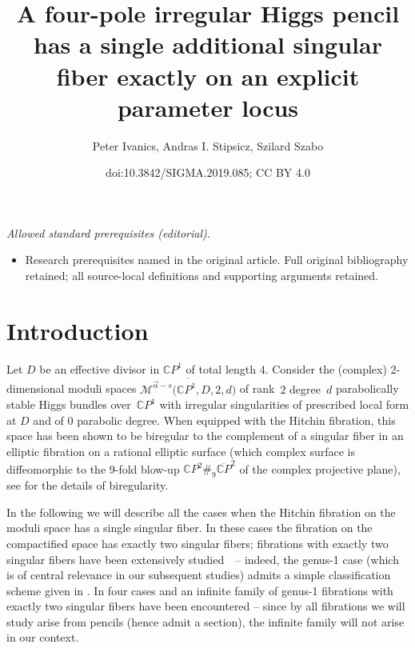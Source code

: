 \documentclass[10pt,a4paper]{amsart}
\title{A four-pole irregular Higgs pencil has a single additional singular fiber exactly on an explicit parameter locus}
\author{Peter Ivanics, Andras I. Stipsicz, Szilard Szabo}
\date{doi:10.3842/SIGMA.2019.085; CC BY 4.0}
\newcommand{\CP}[1]{\mathbb{C}P^{#1}} %
\newcommand{\Mod}{{\mathcal M}} %
\newcommand{\CPbar}{{\overline {{\mathbb {C}}P}}^2}
\numberwithin{equation}{section}
\begin{document}
\maketitle
\noindent\textit{Allowed standard prerequisites (editorial).}\begin{itemize}
\item Research prerequisites named in the original article. Full original bibliography retained; all source-local definitions and supporting arguments retained.
\end{itemize}\medskip
\section{Introduction}\label{sec:intro}
Let $D$ be an effective divisor in $\CP1$ of total length $4$. Consider the (complex) 2-dimensional moduli spaces ${\overline{\Mod^{\vec{\alpha}-s}\big(\CP1, D, 2, d\big)}}$ of rank~$2$ {degree~$d$} parabolically stable Higgs bundles over~$\CP{1}$ with irregular singularities {of prescribed local form at $D$ and of $0$ parabolic degree}. When equipped with the Hitchin fibration, this space has been shown to be biregular to the complement of a singular fiber in an elliptic fibration on a rational elliptic surface (which complex surface is diffeomorphic to the 9-fold blow-up $\CP{2}\# _9 \CPbar$ of the complex projective plane), see \cite[Section~3.3]{ISS2} for the details of biregularity.

In the following we will describe all the cases
when the Hitchin fibration on the moduli space has a single singular
fiber. In these cases the fibration on the compactified space has
exactly two singular fibers; fibrations with exactly two singular
fibers have been extensively studied~\cite{TwoSing1, TwoSing3}~--
indeed, the genus-1 case (which is of central relevance in our
subsequent studies) admits a simple classification scheme given in
\cite[Theorem~3.2]{TwoSing3}. In \cite[Theorem~3.2]{TwoSing3} four
cases and an infinite family of genus-1 fibrations with exactly two
singular fibers have been encountered -- since by
\cite[Section~4]{Sz-spectral} all fibrations we will study arise from
pencils (hence admit a section), the infinite family will not arise in
our context.
\end{document}
